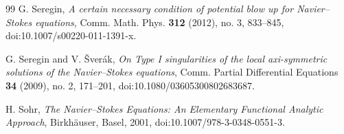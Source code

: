 \documentclass[11pt]{amsart}
\theoremstyle{plain}
\theoremstyle{definition}
\theoremstyle{remark}
\numberwithin{equation}{section}
\begin{document}
\begin{thebibliography}{99}
G. Seregin,
\emph{A certain necessary condition of potential blow up for Navier--Stokes
equations},
Comm. Math. Phys. \textbf{312} (2012), no. 3, 833--845,
doi:10.1007/s00220-011-1391-x.

G. Seregin and V. \v{S}ver\'ak,
\emph{On Type I singularities of the local axi-symmetric solutions of the
Navier--Stokes equations},
Comm. Partial Differential Equations \textbf{34} (2009), no. 2, 171--201,
doi:10.1080/03605300802683687.

H. Sohr,
\emph{The Navier--Stokes Equations: An Elementary Functional Analytic
Approach},
Birkh\"auser, Basel, 2001,
doi:10.1007/978-3-0348-0551-3.

\end{thebibliography}
\end{document}
